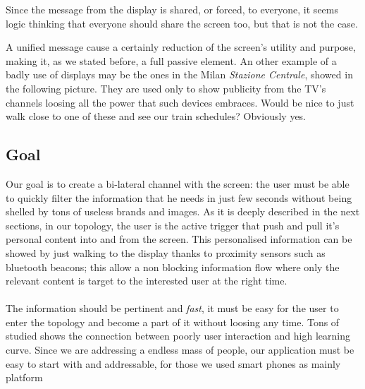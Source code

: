 \documentclass[]{usiinfbachelorproject}
\begin{document}
\begin{figure}[H]
  \centering
\end{figure} 
Since the message from the display is shared, or forced, to everyone, it seems logic thinking that everyone should share the screen too, but that is not the case.

A unified message cause a certainly reduction of the screen's utility and purpose, making it, as we stated before, a full passive element. An other example of a badly use of displays may be the ones in the Milan \emph{Stazione Centrale}, showed in the following picture.
They are used only to show publicity from the TV's channels loosing all the power that such devices embraces. Would be nice to just walk close to one of these and see our train schedules? Obviously yes. 


\subsection{Goal}

Our goal is to create a bi-lateral channel with the screen: the user must be able to quickly filter the information that he needs in just few seconds without being shelled by tons of useless brands and images. As it is deeply described in the next sections, in our topology, the user is the active trigger that push and pull it's personal content into and from the screen. This personalised information can be showed by just walking to the display thanks to proximity sensors such as bluetooth beacons; this allow a non blocking information flow where only the relevant content is target to the interested user at the right time.
\\
\\
The information should be pertinent and \emph{fast}, it must be easy for the user to enter the topology and become a part of it without loosing any time. Tons of studied shows the connection between poorly user interaction and high learning curve. Since we are addressing a endless mass of people, our application must be easy to start with and addressable, for those we used smart phones as mainly platform
\end{document}
